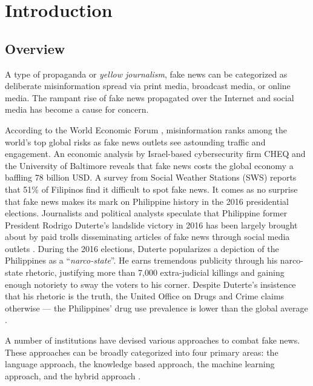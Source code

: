 \chapter{Introduction}
\label{sec:researchdesc}    %

\section{Overview}
\label{sec:overview}

A type of propaganda or \textit{yellow journalism}, fake news \cite{nyt-trump-lies} can be categorized as deliberate misinformation spread via print media, broadcast media, or online media. The rampant rise of fake news propagated over the Internet and social media has become a cause for concern.

According to the World Economic Forum \cite{weforum-report}, misinformation ranks among the world's top global risks as fake news outlets see astounding traffic and engagement. An economic analysis by Israel-based cybersecurity firm CHEQ and the University of Baltimore \cite{pids-report} reveals that fake news costs the global economy a baffling 78 billion USD. A survey from Social Weather Stations (SWS) \cite{juan-felix-et-al-2023} reports that 51\% of Filipinos find it difficult to spot fake news. It comes as no surprise that fake news makes its mark on Philippine history in the 2016 presidential elections. Journalists and political analysts speculate that Philippine former President Rodrigo Duterte's landslide victory in 2016 has been largely brought about by paid trolls disseminating articles of fake news through social media outlets \cite{harvard-cyber-report}. During the 2016 elections, Duterte popularizes a depiction of the Philippines as a \enquote{\textit{narco-state}}\cite{demick2016duterte}. He earns tremendous publicity through his narco-state rhetoric, justifying more than 7,000 extra-judicial killings \cite{alconaba2016digong} and gaining enough notoriety to sway the voters to his corner. Despite Duterte's insistence that his rhetoric is the truth, the United Office on Drugs and Crime claims otherwise — the Philippines' drug use prevalence is lower than the global average \cite{yee2017posttruth}.

A number of institutions have devised various approaches to combat fake news. These approaches can be broadly categorized into four primary areas: the language approach, the knowledge based approach, the machine learning approach, and the hybrid approach \cite{debeer2020approaches}.

